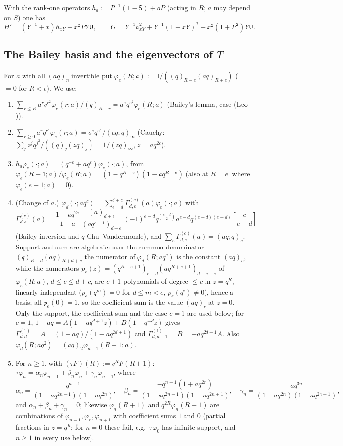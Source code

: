 \documentclass[11pt]{amsart}
\theoremstyle{definition}
\numberwithin{equation}{section}
\newcommand{\qbin}[2]{\genfrac{[}{]}{0pt}{}{#1}{#2}}
\begin{document}
With the rank-one operators $h_a:=P^{-1}(1-\mathsf S)+aP$ (acting in $R$; $a$ may depend on $S$) one has
\begin{equation}\label{eq:HGh}
H'=(Y^{-1}+x)h_{xY}-x^2PY\mathsf U,\qquad G=Y^{-1}h_{xY}^2+Y^{-1}(1-xY)^2-x^2(1+P^2)Y\mathsf U.
\end{equation}

\subsection{The Bailey basis and the eigenvectors of \texorpdfstring{$T$}{T}}\label{ssec:basis}
For $a$ with all $(aq)_n$ invertible put $\varphi_e(R;a):=1/((q)_{R-e}(aq)_{R+e})$ ($=0$ for $R<e$). We use:
\begin{enumerate}[label=(B-\roman*),leftmargin=3em]
\item $\sum_{r\le R}a^rq^{r^2}\varphi_e(r;a)/(q)_{R-r}=a^eq^{e^2}\varphi_e(R;a)$ (Bailey's lemma, case (L$\infty$)).
\item $\sum_{r\ge0}a^rq^{r^2}\varphi_e(r;a)=a^eq^{e^2}/(aq;q)_\infty$ (Cauchy: $\sum_jz^jq^{j^2}/((q)_j(zq)_j)=1/(zq)_\infty$,
$z=aq^{2e}$).
\item $h_a\varphi_e(\cdot;a)=(q^{-e}+aq^e)\varphi_e(\cdot;a)$, from $\varphi_e(R-1;a)/\varphi_e(R;a)=(1-q^{R-e})(1-aq^{R+e})$
(also at $R=e$, where $\varphi_e(e-1;a)=0$).
\item (Change of $a$.) $\varphi_d(\cdot;aq^c)=\sum_{e=d}^{d+c}\Gamma^{(c)}_{d,e}(a)\varphi_e(\cdot;a)$ with
\[\Gamma^{(c)}_{d,e}(a)=\frac{1-aq^{2e}}{1-a}\,\frac{(a)_{d+e}}{(aq^{c+1})_{d+e}}\,(-1)^{e-d}q^{\binom{e-d}2}a^{e-d}q^{(e+d)(e-d)}\qbin{c}{e-d}\]
(Bailey inversion and $q$-Chu--Vandermonde), and $\sum_e\Gamma^{(c)}_{d,e}(a)=(aq;q)_c$. Support and sum are
algebraic: over the common denominator $(q)_{R-d}(aq)_{R+d+c}$ the numerator of $\varphi_d(R;aq^c)$ is the constant
$(aq)_c$, while the numerators $p_e(z)=(q^{R-e+1})_{e-d}(aq^{R+e+1})_{d+c-e}$ of $\varphi_e(R;a)$, $d\le e\le d+c$,
are $c+1$ polynomials of degree $\le c$ in $z=q^R$, linearly independent ($p_e(q^m)=0$ for $d\le m<e$,
$p_e(q^e)\ne0$), hence a basis; all $p_e(0)=1$, so the coefficient sum is the value $(aq)_c$ at $z=0$. Only the support,
the coefficient sum and the case $c=1$ are used below; for $c=1$, $1-aq=A(1-aq^{d+1}z)+B(1-q^{-d}z)$ gives
$\Gamma^{(1)}_{d,d}=A=(1-aq)/(1-aq^{2d+1})$ and $\Gamma^{(1)}_{d,d+1}=B=-aq^{2d+1}A$. Also
$\varphi_d(R;aq^2)=(aq)_2\varphi_{d+1}(R+1;a)$.
\item For $n\ge1$, with $(\tau F)(R):=q^RF(R+1)$: $\tau\varphi_n=\alpha_n\varphi_{n-1}+\beta_n\varphi_n+\gamma_n\varphi_{n+1}$, where
\[\alpha_n=\frac{q^{n-1}}{(1-aq^{2n-1})(1-aq^{2n})},\quad \beta_n=\frac{-q^{n-1}(1+aq^{2n})}{(1-aq^{2n-1})(1-aq^{2n+1})},\quad
\gamma_n=\frac{aq^{3n}}{(1-aq^{2n})(1-aq^{2n+1})},\]
and $\alpha_n+\beta_n+\gamma_n=0$; likewise $\varphi_n(R+1)$ and $q^{2R}\varphi_n(R+1)$ are combinations of
$\varphi_{n-1},\varphi_n,\varphi_{n+1}$ with coefficient sums $1$ and $0$ (partial fractions in $z=q^R$; for $n=0$
these fail, e.g.\ $\tau\varphi_0$ has infinite support, and $n\ge1$ in every use below).
\end{enumerate}
\end{document}
